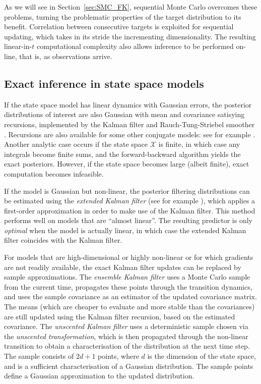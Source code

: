 As we will see in Section~\ref{sec:SMC_FK}, sequential Monte Carlo overcomes these problems, turning the problematic properties of the target distribution to its benefit. Correlation between consecutive targets is exploited for sequential updating, which takes in its stride the incrementing dimensionality. The resulting linear-in-$t$ computational complexity also allows inference to be performed on-line, that is, as observations arrive.




\subsection{Exact inference in state space models}
\label{sec:SSM_exact_inference}
If the state space model has linear dynamics with Gaussian errors, the posterior distributions of interest are also Gaussian with mean and covariance satisying recursions, implemented by the Kalman filter \parencite{kalman1960} and Rauch-Tung-Striebel smoother \parencite{rauch1965}. Recursions are also available for some other conjugate models: see for example \textcite{vidoni1999}.
Another analytic case occurs if the state space $\mathcal{X}$ is finite, in which case any integrals become finite sums, and the forward-backward algorithm \parencite{baum1970} yields the exact posteriors. However, if the state space becomes large (albeit finite), exact computation becomes infeasible.

If the model is Gaussian but non-linear, the posterior filtering distributions can be estimated using the \emph{extended Kalman filter} (see for example \textcite{jazwinski2007}), which applies a first-order approximation in order to make use of the Kalman filter. This method performs well on models that are ``almost linear''. The resulting predictor is only \emph{optimal} when the model is actually linear, in which case the extended Kalman filter coincides with the Kalman filter.

For models that are high-dimensional or highly non-linear or for which gradients are not readily available, the exact Kalman filter updates can be replaced by sample approximations.
The \emph{ensemble Kalman filter} \parencite{evensen1994} uses a Monte Carlo sample from the current time, propagates these points through the transition dynamics, and uses the sample covariance as an estimator of the updated covariance matrix. The means (which are cheaper to evaluate and more stable than the covariances) are still updated using the Kalman filter recursion, based on the estimated covariance.
The \emph{unscented Kalman filter} \parencite{wan2000} uses a deterministic sample chosen via the \emph{unscented transformation}, which is then propagated through the non-linear transition to obtain a characterisation of the distribution at the next time step. The sample consists of $2d+1$ points, where $d$ is the dimension of the state space, and is a sufficient characterisation of a Gaussian distribution. The sample points define a Gaussian approximation to the updated distribution.

